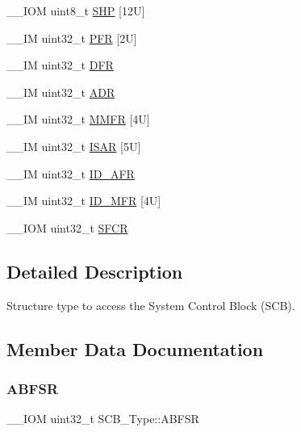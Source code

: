 \begin{DoxyCompactItemize}
\item 
\+\_\+\+\_\+\+I\+OM uint8\+\_\+t \mbox{\hyperlink{struct_s_c_b___type_a9b05f74580fc93daa7fe2f0e1c9c5663}{S\+HP}} \mbox{[}12\+U\mbox{]}
\item 
\+\_\+\+\_\+\+IM uint32\+\_\+t \mbox{\hyperlink{struct_s_c_b___type_a40745bb0af880c45827a653222d54117}{P\+FR}} \mbox{[}2\+U\mbox{]}
\item 
\+\_\+\+\_\+\+IM uint32\+\_\+t \mbox{\hyperlink{struct_s_c_b___type_a85dd6fe77aab17e7ea89a52c59da6004}{D\+FR}}
\item 
\+\_\+\+\_\+\+IM uint32\+\_\+t \mbox{\hyperlink{struct_s_c_b___type_af084e1b2dad004a88668efea1dfe7fa1}{A\+DR}}
\item 
\+\_\+\+\_\+\+IM uint32\+\_\+t \mbox{\hyperlink{struct_s_c_b___type_a4f353f207bb27a1cea7861aa9eb00dbb}{M\+M\+FR}} \mbox{[}4\+U\mbox{]}
\item 
\+\_\+\+\_\+\+IM uint32\+\_\+t \mbox{\hyperlink{struct_s_c_b___type_a00e93446b3433a807f1574fa2f1fce54}{I\+S\+AR}} \mbox{[}5\+U\mbox{]}
\item 
\+\_\+\+\_\+\+IM uint32\+\_\+t \mbox{\hyperlink{struct_s_c_b___type_a9c9a1d805f8e99b9fd3ab4f455b6333a}{I\+D\+\_\+\+A\+FR}}
\item 
\+\_\+\+\_\+\+IM uint32\+\_\+t \mbox{\hyperlink{struct_s_c_b___type_a781ef24d88610a432e7d5b179d78de47}{I\+D\+\_\+\+M\+FR}} \mbox{[}4\+U\mbox{]}
\item 
\+\_\+\+\_\+\+I\+OM uint32\+\_\+t \mbox{\hyperlink{struct_s_c_b___type_a82273352d2e8c7a28a7b7cbdfc3d6a75}{S\+F\+CR}}
\end{DoxyCompactItemize}


\subsection{Detailed Description}
Structure type to access the System Control Block (S\+CB). 

\subsection{Member Data Documentation}
\mbox{\label{struct_s_c_b___type_a35a95c9a21f43a569a7ac212acb4cee7}} 
\subsubsection{\texorpdfstring{ABFSR}{ABFSR}}
{\footnotesize\ttfamily \+\_\+\+\_\+\+I\+OM uint32\+\_\+t S\+C\+B\+\_\+\+Type\+::\+A\+B\+F\+SR}

